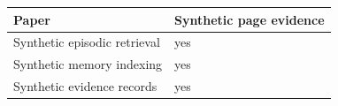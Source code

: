 \begin{tabular}{ll}
\toprule
Paper & Synthetic page evidence \\
\midrule
Synthetic episodic retrieval & yes \\
Synthetic memory indexing & yes \\
Synthetic evidence records & yes \\
\bottomrule
\end{tabular}
